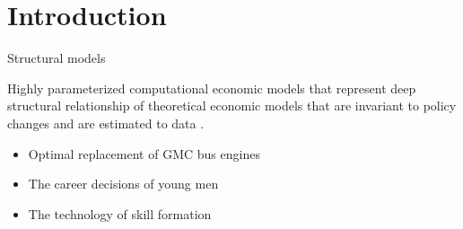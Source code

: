 \section*{Introduction}\addtocounter{framenumber}{-1}
\begin{frame}{Structural models}\vspace{0.3cm}

Highly parameterized computational economic models that represent deep structural relationship of theoretical economic models that are invariant to policy changes and are estimated to data \citep{Hood.1953}.\vspace{0.3cm}

\pause
  \vspace{0.3cm}
	\begin{itemize}\setlength\itemsep{1em}
  \item Optimal replacement of GMC bus engines
	\item The career decisions of young men
  \item The technology of skill formation
	\end{itemize}
\end{frame}


